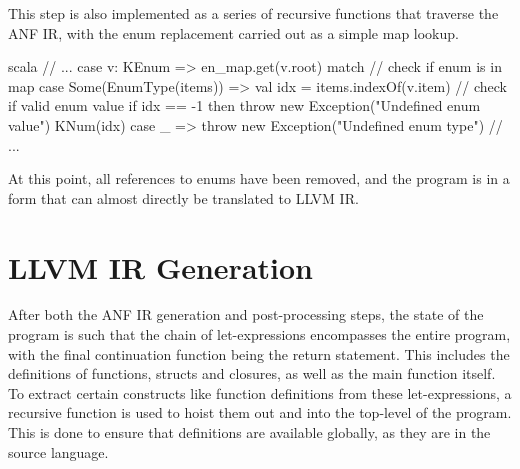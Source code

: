 This step is also implemented as a series of recursive functions that traverse the ANF IR, with the
enum replacement carried out as a simple map lookup.

\begin{code}{scala}
    // ...
    case v: KEnum =>
        en_map.get(v.root) match {
            // check if enum is in map
            case Some(EnumType(items)) =>
                val idx = items.indexOf(v.item)
                // check if valid enum value
                if idx == -1 then
                    throw new Exception("Undefined enum value")
                KNum(idx)
            case _ => throw new Exception("Undefined enum type")
        }
    // ...
\end{code}

At this point, all references to enums have been removed, and the program is in a form that can
almost directly be translated to LLVM IR.

\section{LLVM IR Generation}

After both the ANF IR generation and post-processing steps, the state of the program is such that
the chain of let-expressions encompasses the entire program, with the final continuation function
being the return statement. This includes the definitions of functions, structs and closures, as
well as the main function itself. To extract certain constructs like function definitions from these
let-expressions, a recursive function is used to hoist them out and into the top-level of the
program. This is done to ensure that definitions are available globally, as they are in the source
language.

